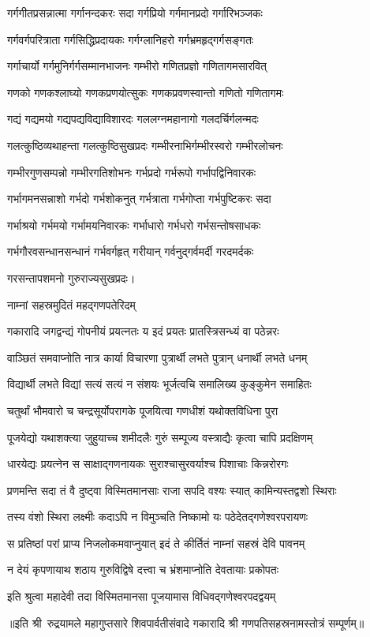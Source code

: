 \twolineshloka
{गर्गगीतप्रसन्नात्मा गर्गानन्दकरः सदा}%
{गर्गप्रियो गर्गमानप्रदो गर्गारिभञ्जकः}%

\twolineshloka
{गर्गवर्गपरित्राता गर्गसिद्धिप्रदायकः}%
{गर्गग्लानिहरो गर्गभ्रमहृद्गर्गसङ्गतः}%

\twolineshloka
{गर्गाचार्यो गर्गमुनिर्गर्गसम्मानभाजनः}%
{गम्भीरो गणितप्रज्ञो गणितागमसारवित्}%

\twolineshloka
{गणको गणकश्लाघ्यो गणकप्रणयोत्सुकः}%
{गणकप्रवणस्वान्तो गणितो गणितागमः}%

\twolineshloka
{गद्यं गद्यमयो गद्यपद्यविद्याविशारदः}%
{गललग्नमहानागो गलदर्चिर्गलन्मदः}%

\twolineshloka
{गलत्कुष्ठिव्यथाहन्ता गलत्कुष्ठिसुखप्रदः}%
{गम्भीरनाभिर्गम्भीरस्वरो गम्भीरलोचनः}%

\twolineshloka
{गम्भीरगुणसम्पन्नो गम्भीरगतिशोभनः}%
{गर्भप्रदो गर्भरूपो गर्भापद्विनिवारकः}%

\twolineshloka
{गर्भागमनसन्नाशो गर्भदो गर्भशोकनुत्}%
{गर्भत्राता गर्भगोप्ता गर्भपुष्टिकरः सदा}%

\twolineshloka
{गर्भाश्रयो गर्भमयो गर्भामयनिवारकः}%
{गर्भाधारो गर्भधरो गर्भसन्तोषसाधकः}%

\twolineshloka
{गर्भगौरवसन्धानसन्धानं गर्भवर्गहृत्}%
{गरीयान् गर्वनुद्गर्वमर्दी गरदमर्दकः}%

{गरसन्तापशमनो गुरुराज्यसुखप्रदः।}%

\onelineshloka
{नाम्नां सहस्रमुदितं महद्गणपतेरिदम्}%


\twolineshloka
{गकारादि जगद्वन्द्यं गोपनीयं प्रयत्नतः}%
{य इदं प्रयतः प्रातस्त्रिसन्ध्यं वा पठेन्नरः}%

\twolineshloka
{वाञ्छितं समवाप्नोति नात्र कार्या विचारणा}%
{पुत्रार्थी लभते पुत्रान् धनार्थी लभते धनम्}%

\twolineshloka
{विद्यार्थी लभते विद्यां सत्यं सत्यं न संशयः}%
{भूर्जत्वचि समालिख्य कुङ्कुमेन समाहितः}%

\twolineshloka
{चतुर्थां भौमवारो च चन्द्रसूर्योपरागके}%
{पूजयित्वा गणधीशं यथोक्तविधिना पुरा}%

\twolineshloka
{पूजयेद्यो यथाशक्त्या जुहुयाच्च शमीदलैः}%
{गुरुं सम्पूज्य वस्त्राद्यैः कृत्वा चापि प्रदक्षिणम्}%

\twolineshloka
{धारयेद्यः प्रयत्नेन स साक्षाद्गणनायकः}%
{सुराश्चासुरवर्याश्च पिशाचाः किन्नरोरगः}%

\twolineshloka
{प्रणमन्ति सदा तं वै दुष्ट्वा विस्मितमानसाः}%
{राजा सपदि वश्यः स्यात् कामिन्यस्तद्वशो स्थिराः}%

\twolineshloka
{तस्य वंशो स्थिरा लक्ष्मीः कदाऽपि न विमुञ्चति}%
{निष्कामो यः पठेदेतद्गणेश्वरपरायणः}%

\twolineshloka
{स प्रतिष्ठां परां प्राप्य निजलोकमवाप्नुयात्}%
{इदं ते कीर्तितं नाम्नां सहस्रं देवि पावनम्}%

\twolineshloka
{न देयं कृपणायाथ शठाय गुरुविद्विषे}%
{दत्त्वा च भ्रंशमाप्नोति देवतायाः प्रकोपतः}%

\twolineshloka
{इति श्रुत्वा महादेवी तदा विस्मितमानसा}%
{पूजयामास विधिवद्गणेश्वरपदद्वयम्}%

॥इति श्री~रुद्रयामले महागुप्तसारे शिवपार्वतीसंवादे गकारादि श्री गणपतिसहस्रनामस्तोत्रं सम्पूर्णम्॥
